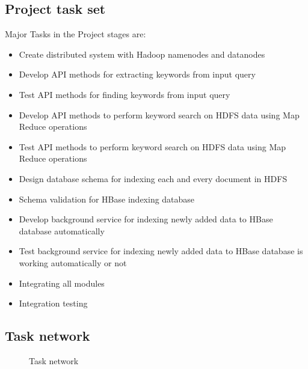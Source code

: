 \documentclass[oneside,a4paper,12pt]{report}
\begin{document}
\subsection{Project task set}  
Major Tasks in the Project stages are: 
\begin{itemize}
\item Create distributed system with Hadoop namenodes and datanodes
\item Develop API methods for extracting keywords from input query
\item Test API methods for finding keywords from input query
\item Develop API methods to perform keyword search on HDFS data using Map Reduce operations
\item Test API methods to perform keyword search on HDFS data using Map Reduce operations
\item Design database schema for indexing each and every document in HDFS
\item Schema validation for HBase indexing database
\item Develop background service for indexing newly added data to HBase database automatically
\item Test background service for indexing newly added data to HBase database is working automatically or not
\item Integrating all modules
\item Integration testing
\end{itemize}

\subsection{Task network}
\begin{center}
	\begin{figure}[!htbp]
		\centering
	  \caption{Task network}
	  \label{fig:usecase}
	\end{figure}
\end{center}
  
\end{document}
